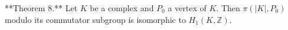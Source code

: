 **Theorem 8.** Let $K$ be a complex and $P_0$ a vertex of $K$. Then $\pi(|K|, P_0)$ modulo its commutator subgroup is isomorphic to $H_1(K, \mathbb{Z})$.
